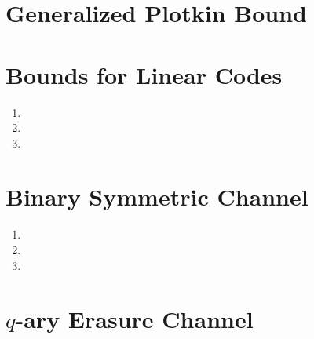 \documentclass[12pt]{article}
\begin{document}
\section{Generalized Plotkin Bound}

\pagebreak

\section{Bounds for Linear Codes}

\begin{enumerate}
\item %

\item %

\item %

\end{enumerate}

\section{Binary Symmetric Channel}

\begin{enumerate}
\item %

\item %

\item %

\end{enumerate}

\section{$q$-ary Erasure Channel}
\end{document}

